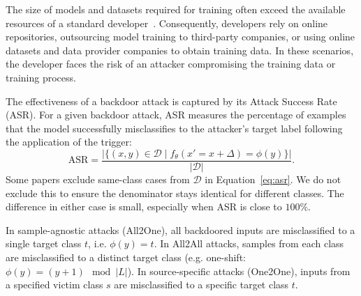 \documentclass[letterpaper,twocolumn,10pt]{article}
\begin{document}
The size of models and datasets required for training often exceed the available resources of a standard developer~\cite{thompson2022computational}. Consequently, developers rely on online repositories, outsourcing model training to third-party companies, or using online datasets and data provider companies to obtain training data. In these scenarios, the developer faces the risk of an attacker compromising the training data or training process.

The effectiveness of a backdoor attack is captured by its Attack Success Rate (ASR). For a given backdoor attack, ASR measures the percentage of examples that the model successfully misclassifies to the attacker’s target label following the application of the trigger:
\begin{equation}
\label{eq:asr}
    \text{ASR} = \frac{|\{ (x,y) \in \mathcal{D} \mid f_{\theta}(x'=x+\Delta)=\phi(y)\}|}{|\mathcal{D}|}.
\end{equation}
Some papers exclude same-class cases from $\mathcal{D}$ in Equation~\ref{eq:asr}. We do not exclude this to ensure the denominator stays identical for different classes. The difference in either case is small, especially when ASR is close to $100\%$.

In sample-agnostic attacks (All2One), all backdoored inputs are misclassified to a single target class $t$, i.e. $\phi(y)=t$. In All2All attacks, samples from each class are misclassified to a distinct target class (e.g. one-shift: $\phi(y)=(y+1)\mod |L|$). In source-specific attacks (One2One), inputs from a specified victim class $s$ are misclassified to a specific target class $t$.
\end{document}
